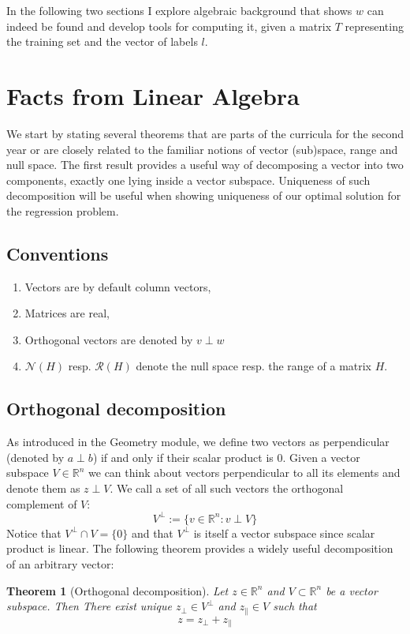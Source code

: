\documentclass[a4paper]{article}
\theoremstyle{break}
\newtheorem{theorem}{Theorem}[section]
\newcommand{\R}{\mathbb{R}}
\newcommand{\Nu}{\mathcal{N}}
\newcommand{\Ra}{\mathcal{R}}
\newcommand{\pll}{\parallel}
\begin{document}
In the following two sections I explore algebraic background that shows $ w $ can indeed be found and develop tools for computing it, given a matrix $T$ representing the training set and the vector of labels $l$.

\section{Facts from Linear Algebra}

We start by stating several theorems that are parts of the curricula for the second year or are closely related to the familiar notions of vector (sub)space, range and null space. The first result provides a useful way of decomposing a vector into two components, exactly one lying inside a vector subspace. Uniqueness of such decomposition will be useful when showing uniqueness of our optimal solution for the regression problem.

\subsection{Conventions}
\begin{enumerate}
    \item Vectors are by default column vectors,
    \item Matrices are real,
    \item Orthogonal vectors are denoted by $ v \perp w$
    \item $\Nu(H)$ resp. $\Ra(H)$ denote the null space resp. the range of a matrix $H$.
\end{enumerate}

\subsection{Orthogonal decomposition}
As introduced in the Geometry module, we define two vectors as perpendicular (denoted by $ a \perp b$) if and only if their scalar product is 0. Given a vector subspace $V \in \R^n$ we can think about vectors perpendicular to all its elements and denote them as $z \perp V$. We call a set of all such vectors the orthogonal complement of $V$:
$$ V^\perp := \{ v \in \R^n : v \perp V\} $$
Notice that $V^\perp \cap V = \{0\}$ and that $V^\perp$ is itself a vector subspace since scalar product is linear. The following theorem provides a widely useful decomposition of an arbitrary vector:

\begin{theorem}[Orthogonal decomposition] \label{thm:projection}
    Let $z \in \R^n$ and $V \subset \R^n$ be a vector subspace. Then
    There exist unique $z_\perp \in V^\perp$ and $z_\pll \in V$ such that  
    \begin{equation}
        z = z_\perp + z_\pll
    \end{equation}
\end{theorem}
\end{document}
